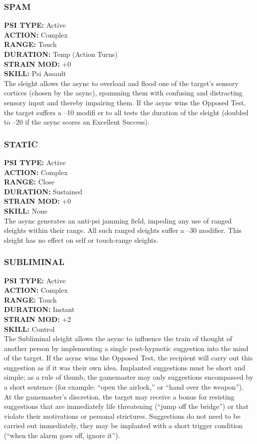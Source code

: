 \subsubsection{SPAM}
\textbf{PSI TYPE:} Active \\ 
\textbf{ACTION:} Complex \\ 
\textbf{RANGE:} Touch \\ 
\textbf{DURATION:} Temp (Action Turns) \\
\textbf{STRAIN MOD:} +0 \\ 
\textbf{SKILL:} Psi Assault \\
The sleight allows the async to overload and flood one
of the target’s sensory cortices (chosen by the async),
spamming them with confusing and distracting sensory
input and thereby impairing them. If the async
wins the Opposed Test, the target suffers a –10 modifi
er to all tests the duration of the sleight (doubled to
–20 if the async scores an Excellent Success).

\subsubsection{STATIC}
\textbf{PSI TYPE:} Active \\ 
\textbf{ACTION:} Complex \\ 
\textbf{RANGE:} Close \\ 
\textbf{DURATION:} Sustained \\
\textbf{STRAIN MOD:} +0 \\ 
\textbf{SKILL:} None\\
The async generates an anti-psi jamming field, impeding
any use of ranged sleights within their range. All
such ranged sleights suffer a –30 modifier. This sleight
has no effect on self or touch-range sleights.

\subsubsection{SUBLIMINAL}
\textbf{PSI TYPE:} Active \\ 
\textbf{ACTION:} Complex \\ 
\textbf{RANGE:} Touch \\ 
\textbf{DURATION:} Instant \\
\textbf{STRAIN MOD:} +2 \\ 
\textbf{SKILL:} Control\\
The Subliminal sleight allows the async to influence
the train of thought of another person by implementing
a single post-hypnotic suggestion into the mind
of the target. If the async wins the Opposed Test, the
recipient will carry out this suggestion as if it was
their own idea. Implanted suggestions must be short
and simple; as a rule of thumb, the gamemaster may
only suggestions encompassed by a short sentence
(for example: “open the airlock,” or “hand over the
weapon”). At the gamemaster’s discretion, the target
may receive a bonus for resisting suggestions that are
immediately life threatening (“jump off the bridge”)
or that violate their motivations or personal strictures.
Suggestions do not need to be carried out immediately,
they may be implanted with a short trigger condition
(“when the alarm goes off, ignore it”).

